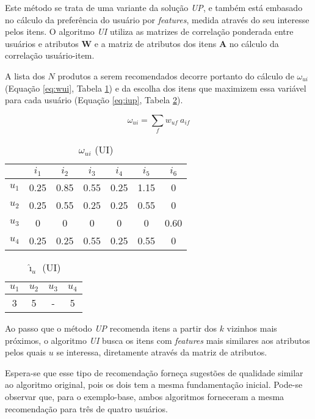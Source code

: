Este método se trata de uma variante da solução \textit{UP}, e também está embasado no cálculo da preferência do usuário por \textit{features}, medida através do seu interesse pelos itens. O algoritmo \textit{UI} utiliza as matrizes de correlação ponderada entre usuários e atributos $\mathbf{W}$ e a matriz de atributos dos itens $\mathbf{A}$ no cálculo da correlação usuário-item.

A lista dos $N$ produtos a serem recomendados decorre portanto do cálculo de $\omega_{ui}$ (Equação \ref{eq:wui}, Tabela \ref{tab:omega_ui_ui}) e da escolha dos itens que maximizem essa variável para cada usuário (Equação \ref{eq:iup}, Tabela \ref{tab:i_u_ui}).

\begin{equation}
\label{eq:wui} 
    \omega_{ui} = \sum_{f}{w_{uf}~a_{if}}
\end{equation} 


\begin{table}[p]
\begin{center}
    \caption{$\omega_{ui}$ (UI)}
    \label{tab:omega_ui_ui}
    \begin{tabular}{ | c | c | c | c | c | c | c | } 
    \hline
     & $i_1$ & $i_2$ & $i_3$ & $i_4$ & $i_5$ & $i_6$ \\ \hline
     $u_1$ & 0.25 & 0.85 & 0.55 & 0.25 & 1.15 & 0 \\ \hline
     $u_2$ & 0.25 & 0.55 & 0.25 & 0.25 & 0.55 & 0 \\ \hline
     $u_3$ & 0    & 0    & 0    & 0    & 0    & 0.60 \\ \hline
     $u_4$ & 0.25 & 0.25 & 0.55 & 0.25 & 0.55 & 0 \\ \hline
    \end{tabular}
\end{center}
\end{table}


\begin{table}[p]
\begin{center}
    \caption{$\hat{\imath}_u$ (UI)}
    \label{tab:i_u_ui}
    \begin{tabular}{ | c | c | c | c | } 
    \hline
     $u_1$ & $u_2$ & $u_3$ & $u_4$   \\ \hline
     3 & 5 & - & 5  \\ \hline
    \end{tabular}
\end{center}
\end{table}

Ao passo que o método \textit{UP} recomenda itens a partir dos $k$ vizinhos mais próximos, o algoritmo \textit{UI} busca os itens com \textit{features} mais similares aos atributos pelos quais $u$ se interessa, diretamente através da matriz de atributos. 

Espera-se que esse tipo de recomendação forneça sugestões de qualidade similar ao algoritmo original, pois os dois tem a mesma fundamentação inicial. Pode-se observar que, para o exemplo-base, ambos algoritmos forneceram a mesma recomendação para três de quatro usuários.


